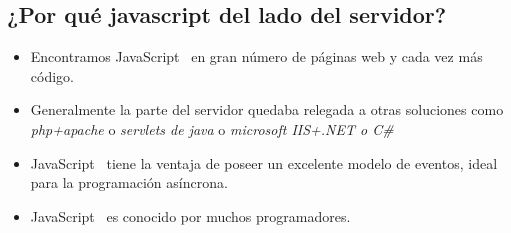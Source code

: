 \documentclass[4paper]{article}
\newcommand{\J}{JavaScript}
\newcommand{\N}{node.js}
\begin{document}
\subsection{¿Por qué javascript del lado del servidor?}
\begin{itemize}
\item Encontramos \J ~ en gran número de páginas web y cada vez más código.
\item Generalmente la parte del servidor quedaba relegada a otras soluciones como \emph{php+apache} o \emph{servlets de java} o \emph{microsoft IIS+.NET o C\#}
\item \J ~  tiene la ventaja de poseer un excelente modelo de eventos, ideal para la programación asíncrona.
\item \J ~ es conocido por muchos programadores.
\end{itemize}
\end{document}
